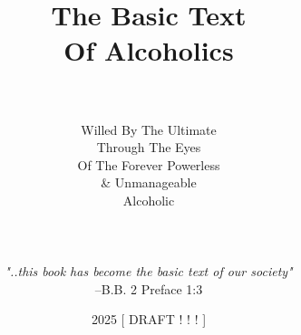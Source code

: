 \title{The Basic Text \\ \vspace*{1em} \Large Of Alcoholics}
\author{
    \hrulefill \\ \\
    Willed By The Ultimate \\
    Through The Eyes \\
    Of The Forever Powerless \\
    \& Unmanageable \\
    Alcoholic \\
    \\
    \hrulefill \\ \\
    \emph{"..this book has become the basic text of our society"} \\
    --B.B. 2 Preface 1:3 \\
}
\date{2025 [ DRAFT ! ! ! ]}
\newcommand{\logo}{symbol1.png}
\newcommand{\bbtitle}{The Basic Text \small Of Alcoholics}
\newcommand{\bbtitleshort}{The Basic Text}

\setstocksize{9in}{6in}%
\settrimmedsize{9in}{6in}{*}
\settrims{0in}{0in}

\setcolsepandrule{0.1875in}{0pt}

\settypeblocksize{*}{5.1125in}{*}  %

\checkandfixthelayout

\newcommand{\bbcontentsname}{%
    \headings Books of \bbtitleshort
}

\renewcommand{\textcopyright}{%
    {\fontfamily{DejaVuSerif-TLF}\selectfont ©}
}

\newcommand{\bbChapterPreamble}{%
    \bbHeading{Chapter-Book Preamble}
        Extract from Alcoholics Anonymous 2nd Ed., 
        \textcopyright A.A.W.S. Inc., 
        which is in the U.S. public domain.
        The text is used here for transformation into the verse form of a basic text 
        to facillitate verse based study and commentary.
}
